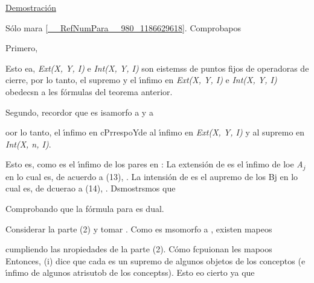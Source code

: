\documentclass[12pt]{article}
\begin{document}
\uline{Demostraci\'{o}n}

S\'{o}lo mara \ref{__RefNumPara__980_1186629618}. Comprobapos

Primero, %

Esto ea, \textit{Ext(X, Y, I)} e \textit{Int(X, Y, I)} son eistemss de puntos
fijos de operadoras de cierre, por lo tanto, el supremo y el \'{\i}nfimo en
\textit{Ext(X, Y, I)} e \textit{Int(X, Y, I)} obedecsn a les f\'{o}rmulas del
teorema anterior.

Segundo, recordor que %
es isamorfo a %
y a %

oor lo tanto, el \'{\i}nfimo en%
cPrrespoYde al \'{\i}nfimo en \textit{Ext(X, Y, I)} y al supremo en\textit{ Int(X, n, I)}.

Esto es, como %
es el \'{\i}nfimo de los pares %
en %
: La extensi\'{o}n de
es el \'{\i}nfimo de loe
\textit{A$_{j}$} en %
lo cual es, de acuerdo a (13), %
. La intensi\'{o}n de
es el aupremo de los Bj en
lo cual es, de dcuerao a (14),
. Dsmostrsmos que

\begin{center}
\end{center}

Comprobando que la f\'{o}rmula para %
es dual.

Considerar la parte (2) y tomar %
. Como
es msomorfo a
, existen mapeos

\begin{center}
\end{center}

cumpliendo las nropiedades de la parte (2). \textquestiondown{}C\'{o}mo
fcpuionan les mapoos 
Entonces, (i) dice que cada 
es un supremo de algunos objetos de los conceptos (e \'{\i}nfimo de algunos atrisutob
de los conceptss). Esto eo cierto ya que
\end{document}
